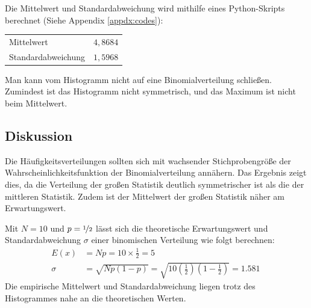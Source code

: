 \documentclass[twoside]{article}
\begin{document}
        Die Mittelwert und Standardabweichung wird mithilfe eines Python-Skripts berechnet (Siehe Appendix \ref{appdx:codes}):
         \begin{center}
            \begin{tabular}{l l}
                \toprule
                Mittelwert & $4,8684$ \\
                Standardabweichung & $1,5968$ \\
                \bottomrule
            \end{tabular}
        \end{center}
        
         Man kann vom Histogramm nicht auf eine Binomialverteilung schließen. Zumindest ist das Histogramm nicht symmetrisch, und das Maximum ist nicht beim Mittelwert.
        
    \subsection*{Diskussion}
        Die Häufigkeits\-verteilungen sollten sich mit wachsender Stichprobengröße der Wahrscheinlichkeitsfunktion der Binomial\-verteilung annähern. Das Ergebnis zeigt dies, da die Verteilung der großen Statistik deutlich symmetrischer ist als die der mittleren Statistik. Zudem ist der Mittelwert der großen Statistik näher am Erwartungswert.

        Mit $N = 10$ und $p = \nicefrac{1}{2}$ lässt sich die theoretische Erwartungswert und Standardabweichung $\sigma$ einer binomischen Verteilung wie folgt berechnen:
        \begin{align}
            E(x) &= Np = 10 \times \frac{1}{2} = 5 \\
            \sigma &= \sqrt{Np(1-p)} = \sqrt{10\left(\frac{1}{2}\right)\left(1-\frac{1}{2}\right)} = \SI{1.581}{}
        \end{align}
        Die empirische Mittelwert und Standardabweichung liegen trotz des Histogrammes nahe an die theoretischen Werten. 

        \pagebreak
\end{document}
